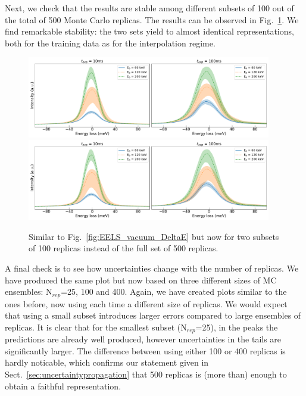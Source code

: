 Next, we check that the results are stable among different subsets of 100 out of the 
total of 500 Monte Carlo replicas. 
%
The results can be observed in Fig.~\ref{fig:EELS_vacuum_DeltaE_check2}.
%
We find remarkable stability: the two sets yield to almost identical representations,
both for the training data as for the interpolation regime. 
%
\begin{figure}[H]
\centering
 \includegraphics[width=0.95\textwidth]{plots/Prediction_120keV_100replicas_part1.pdf}
 \includegraphics[width=0.95\textwidth]{plots/Prediction_120keV_100replicas_part2.pdf}
 \caption{Similar to Fig.~\ref{fig:EELS_vacuum_DeltaE} but now for two subsets of 100 replicas
 instead of the full set of 500 replicas.
 }
\label{fig:EELS_vacuum_DeltaE_check2}
\end{figure}

A final check is to see how uncertainties change with the number of replicas. 
We have produced the same plot but now based on three different sizes of MC ensembles:
N$_{rep}$=25, 100 and 400. 
%
Again, we have created plots similar to the ones before, now using each time
a different size of replicas. 
%
We would expect that using a small subset introduces larger errors compared to 
large ensembles of replicas.
%
It is clear that for the smallest subset (N$_{rep}$=25), in the peaks the predictions are
already well produced, however uncertainties in the tails are significantly larger.
%
The difference between using either 100 or 400 replicas is hardly noticable, which
confirms our statement given in Sect.~\ref{sec:uncertaintypropagation} that 500
replicas is (more than) enough to obtain a faithful representation.

